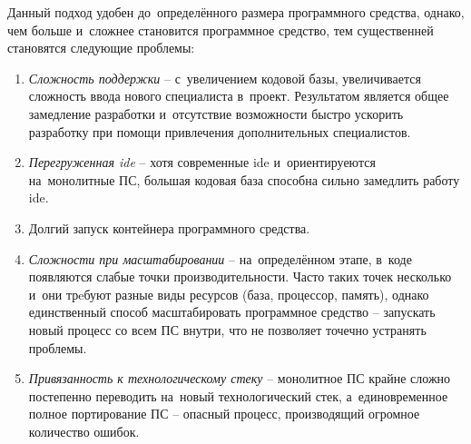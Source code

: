 Данный подход удобен до~определённого размера программного средства, однако, чем больше и~сложнее становится программное средство, тем существенней становятся следующие проблемы:

\begin{enumerate}
	\item \emph{Сложность поддержки} -- с~увеличением кодовой базы, увеличивается сложность ввода нового специалиста в~проект. Результатом является общее замедление разработки и~отсутствие возможности быстро ускорить разработку при помощи привлечения дополнительных специалистов.
	\item \emph{Перегруженная \gls{ide}} -- хотя современные \gls{ide} и~ориентируеются на~монолитные ПС, большая кодовая база способна сильно замедлить работу \gls{ide}.
	\item Долгий запуск контейнера программного средства.
	\item \emph{Сложности при масштабировании} -- на~определённом этапе, в~коде появляются слабые точки производительности. Часто таких точек несколько и~они трeбуют разные виды ресурсов (база, процессор, память), однако единственный способ масштабировать программное средство -- запускать новый процесс со всем ПС внутри, что не позволяет точечно устранять проблемы.
	\item \emph{Привязанность к технологическому стеку} -- монолитное ПС крайне сложно постепенно переводить на~новый технологический стек, а~единовременное полное портирование ПС -- опасный процесс, производящий огромное количество ошибок.
\end{enumerate}